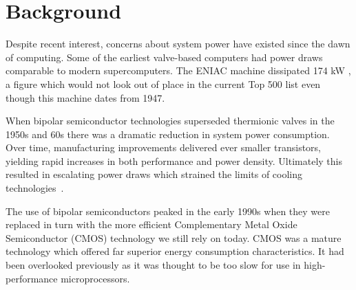 \section{Background}
\label{sec:background}
Despite recent interest, concerns about system power have existed since the dawn of computing. Some of the earliest valve-based computers had power draws comparable to modern supercomputers. The ENIAC machine dissipated 174 kW \cite{birnbaum:2000aa}, a figure which would not look out of place in the current Top 500 list even though this machine dates from 1947.\golden

When bipolar semiconductor technologies superseded thermionic valves in the 1950s and 60s there was a dramatic reduction in system power consumption. Over time, manufacturing improvements delivered ever smaller transistors, yielding rapid increases in both performance and power density. Ultimately this resulted in escalating power draws which strained the limits of cooling technologies~\cite{jouppi:1994aa}. \golden

The use of bipolar semiconductors peaked in the early 1990s when they were replaced in turn with the more efficient Complementary Metal Oxide Semiconductor (CMOS) technology we still rely on today. CMOS was a mature technology which offered far superior energy consumption characteristics. It had been  overlooked previously as it was thought to be too slow for use in high-performance microprocessors. \golden

